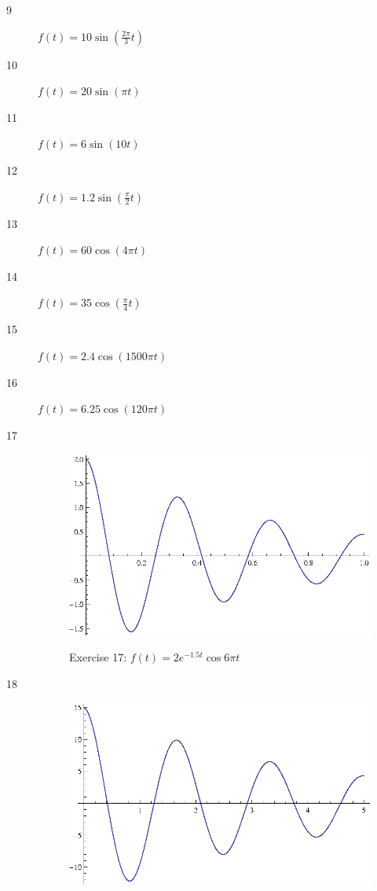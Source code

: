 \documentclass{exam}
\begin{document}
    \begin{description}
      \item[9] $f(t) = 10 \sin \left( \frac{2 \pi}{3} t \right)$

      \item[10] $f(t) = 20 \sin \left( \pi t \right)$

      \item[11] $f(t) = 6 \sin \left( 10 t \right)$

      \item[12] $f(t) = 1.2 \sin \left( \frac{\pi}{2} t \right)$
        
      \item[13] $f(t) = 60 \cos \left( 4 \pi t \right)$

      \item[14] $f(t) = 35 \cos \left( \frac{\pi}{4} t \right)$

      \item[15] $f(t) = 2.4 \cos \left( 1500 \pi t \right)$

      \item[16] $f(t) = 6.25 \cos \left( 120 \pi t \right)$

      \item[17]
        \begin{figure}[H]
          \centering
          \includegraphics{exercise17.eps}

          Exercise 17: $f(t) = 2 e^{-1.5t} \cos 6 \pi t$
        \end{figure}

      \item[18]
        \begin{figure}[H]
          \centering
          \includegraphics{exercise18.eps}


\end{figure}
\end{description}
\end{document}
